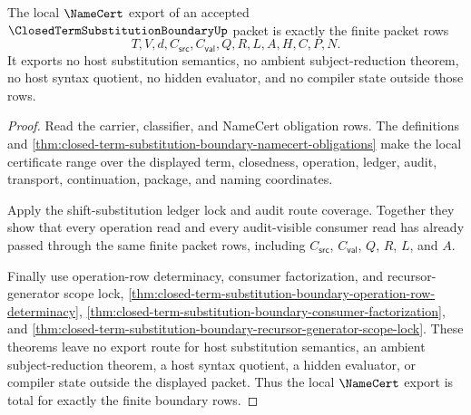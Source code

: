 \begin{theorem}
\label{thm:closed-term-substitution-boundary-namecert-export-totality}
The local $\NameCert$ export of an accepted $\ClosedTermSubstitutionBoundaryUp$ packet is exactly the finite packet rows
$$
T,V,d,C_{\mathsf{src}},C_{\mathsf{val}},Q,R,L,A,H,C,P,N.
$$
It exports no host substitution semantics, no ambient subject-reduction theorem, no host syntax quotient, no hidden evaluator, and no compiler state outside those rows.
\end{theorem}
\begin{proof}
Read the carrier, classifier, and NameCert obligation rows. The definitions and \autoref{thm:closed-term-substitution-boundary-namecert-obligations} make the local certificate range over the displayed term, closedness, operation, ledger, audit, transport, continuation, package, and naming coordinates.

Apply the shift-substitution ledger lock and audit route coverage. Together they show that every operation read and every audit-visible consumer read has already passed through the same finite packet rows, including $C_{\mathsf{src}}$, $C_{\mathsf{val}}$, $Q$, $R$, $L$, and $A$.

Finally use operation-row determinacy, consumer factorization, and recursor-generator scope lock, \autoref{thm:closed-term-substitution-boundary-operation-row-determinacy}, \autoref{thm:closed-term-substitution-boundary-consumer-factorization}, and \autoref{thm:closed-term-substitution-boundary-recursor-generator-scope-lock}. These theorems leave no export route for host substitution semantics, an ambient subject-reduction theorem, a host syntax quotient, a hidden evaluator, or compiler state outside the displayed packet. Thus the local $\NameCert$ export is total for exactly the finite boundary rows.
\end{proof}

